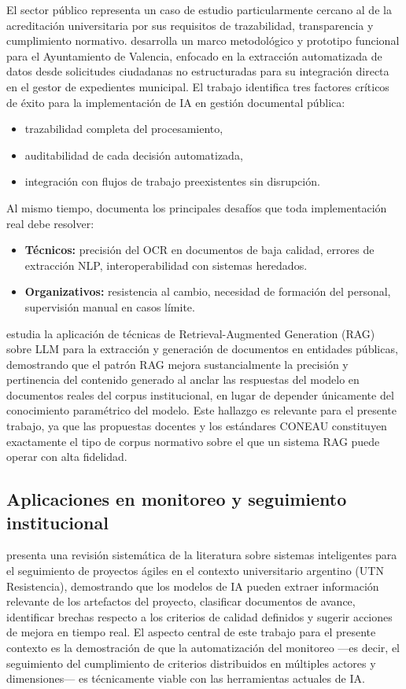 El sector público representa un caso de estudio particularmente cercano al de la acreditación universitaria por sus requisitos de trazabilidad, transparencia y cumplimiento normativo. \citet{paun2025implementacion} desarrolla un marco metodológico y prototipo funcional para el Ayuntamiento de Valencia, enfocado en la extracción automatizada de datos desde solicitudes ciudadanas no estructuradas para su integración directa en el gestor de expedientes municipal. El trabajo identifica tres factores críticos de éxito para la implementación de IA en gestión documental pública:
\begin{itemize}
    \item trazabilidad completa del procesamiento,
    \item auditabilidad de cada decisión automatizada,
    \item integración con flujos de trabajo preexistentes sin disrupción.
\end{itemize}
Al mismo tiempo, documenta los principales desafíos que toda implementación real debe resolver:
\begin{itemize}
    \item \textbf{Técnicos:} precisión del OCR en documentos de baja calidad, errores de extracción NLP, interoperabilidad con sistemas heredados.
    \item \textbf{Organizativos:} resistencia al cambio, necesidad de formación del personal, supervisión manual en casos límite.
\end{itemize}

\citet{collado2024implementacion} estudia la aplicación de técnicas de Retrieval-Augmented Generation (RAG) sobre LLM para la extracción y generación de documentos en entidades públicas, demostrando que el patrón RAG mejora sustancialmente la precisión y pertinencia del contenido generado al anclar las respuestas del modelo en documentos reales del corpus institucional, en lugar de depender únicamente del conocimiento paramétrico del modelo. Este hallazgo es relevante para el presente trabajo, ya que las propuestas docentes y los estándares CONEAU constituyen exactamente el tipo de corpus normativo sobre el que un sistema RAG puede operar con alta fidelidad.

\subsection{Aplicaciones en monitoreo y seguimiento institucional}

\citet{tortosasistemas} presenta una revisión sistemática de la literatura sobre sistemas inteligentes para el seguimiento de proyectos ágiles en el contexto universitario argentino (UTN Resistencia), demostrando que los modelos de IA pueden extraer información relevante de los artefactos del proyecto, clasificar documentos de avance, identificar brechas respecto a los criterios de calidad definidos y sugerir acciones de mejora en tiempo real. El aspecto central de este trabajo para el presente contexto es la demostración de que la automatización del monitoreo ---es decir, el seguimiento del cumplimiento de criterios distribuidos en múltiples actores y dimensiones--- es técnicamente viable con las herramientas actuales de IA.


